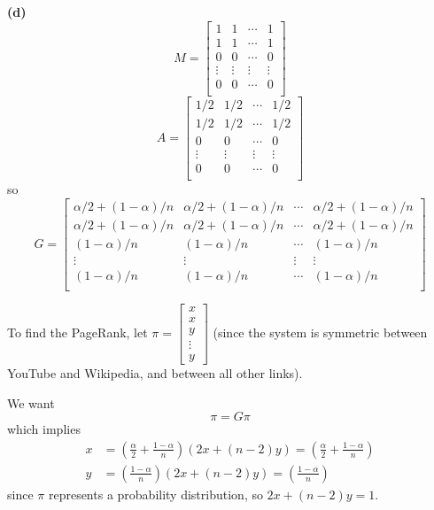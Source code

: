 \documentclass[a4paper, 12pt]{article}
\begin{document}
\begin{solution}
\textbf{(d)}
\[
M = \begin{bmatrix}
1 & 1 & \cdots & 1 \\
1 & 1 & \cdots & 1 \\
0 & 0 & \cdots & 0 \\
\vdots & \vdots & \vdots & \vdots \\
0 & 0 & \cdots & 0 \\
\end{bmatrix}
\]
\[
A = \begin{bmatrix}
    1/2 & 1/2 & \cdots & 1/2 \\
    1/2 & 1/2 & \cdots & 1/2 \\
    0 & 0 & \cdots & 0 \\
    \vdots & \vdots & \vdots & \vdots \\
    0 & 0 & \cdots & 0 \\
    \end{bmatrix}
\]
so \[
G = \begin{bmatrix}
    \alpha/2 + (1-\alpha)/n & \alpha/2 + (1-\alpha)/n& \cdots & \alpha/2 + (1-\alpha)/n\\
    \alpha/2 + (1-\alpha)/n& \alpha/2 + (1-\alpha)/n& \cdots & \alpha/2 + (1-\alpha)/n\\
    (1-\alpha)/n & (1-\alpha)/n & \cdots & (1-\alpha)/n \\
    \vdots & \vdots & \vdots & \vdots \\
    (1-\alpha)/n & (1-\alpha)/n & \cdots & (1-\alpha)/n \\
    \end{bmatrix}
\]

To find the PageRank, let $\pi = \begin{bmatrix}
x \\
x\\
y\\
\vdots\\
y
\end{bmatrix}$ (since the system is symmetric between YouTube and Wikipedia, and between all other links).

We want \[
\pi = G \pi
\]
which implies \begin{align*}
x &= \left(\frac{\alpha}{2} + \frac{1-\alpha}{n}\right)(2 x + (n-2) y) =  \left(\frac{\alpha}{2} + \frac{1-\alpha}{n}\right)\\
y &= \left(\frac{1-\alpha}{n}\right)(2x + (n-2)y) = \left(\frac{1-\alpha}{n}\right)
\end{align*}
since $\pi$ represents a probability distribution, so $2x + (n-2)y = 1$.
\end{solution}
\end{document}
